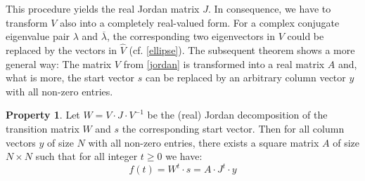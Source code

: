 \documentclass[twoside,11pt]{article}
\theoremstyle{definition}
\newtheorem{prop}{Property}
\begin{document}
This procedure yields the real Jordan matrix $J$. In consequence, we have to
transform $V$ also into a completely real-valued form. For a complex
conjugate eigenvalue pair $\lambda$ and $\overline{\lambda}$, the corresponding
two eigenvectors in $V$ could be replaced by the vectors in $\hat{V}$ (cf.
\cref{ellipse}). The subsequent theorem shows a more general way: The
matrix $V$ from \cref{jordan} is transformed into a real matrix $A$
and, what is more, the start vector $s$ can be replaced by an arbitrary column
vector $y$ with all non-zero entries.

\begin{prop}\label{chad}
Let $W = V \cdot J \cdot V^{-1}$ be the (real) Jordan decomposition of the
transition matrix $W$ and $s$ the corresponding start vector. Then for all
column vectors $y$ of size $N$ with all non-zero entries, there exists a square
matrix $A$ of size $N \times N$ such that for all integer $t \ge 0$ we have: \[
f(t) = W^t \cdot s = A \cdot J^t \cdot y \]
\end{prop}
\end{document}
